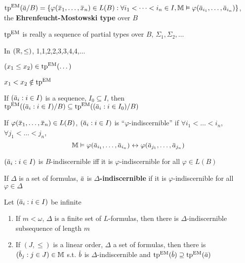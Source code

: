 \documentclass[11pt]{article}
\begin{document}
\begin{definition}[]
\(\tp^{\EM}(\bara/B)=\{\varphi(\barx_1,\dots,\barx_n)\in L(B):\forall i_1<\dots<i_n\in I, \M\vDash\varphi(\bara_{i_1},\dots,\bara_{i_n})\}\),
the \textbf{Ehrenfeucht-Mostowski type} over \(B\)
\end{definition}

\begin{remark}
\(\operatorname{tp}^{\operatorname{EM}}\) is really a sequence of partial types over \(B\), \(\Sigma_1,\Sigma_2,\dots\)
\end{remark}

\begin{examplle}[]
In \((\mathbb{R},\le)\), 1,1,2,2,3,3,4,4,\(\dots\)

\((x_1\le x_2)\in\operatorname{tp}^{\operatorname{EM}}(\dots)\)

\(x_1<x_2\notin\operatorname{tp}^{\operatorname{EM}}\)
\end{examplle}

\begin{remark}
If \((\bara_i:i\in I)\) is a sequence, \(I_0\subseteq I\),
then \(\tp^{\EM}((\bara_i:i\in I)/B)\subseteq\tp^{\EM}((\bara_i:i\in I_0)/B)\)
\end{remark}

\begin{definition}[]
If \(\varphi(\barx_1,\dots,\barx_n)\in L(B)\), \((\bara_i:i\in I)\) is ``\(\varphi\)-indiscernible''
if \(\forall i_1<\dots<i_n\), \(\forall j_1<\dots<j_n\),
\begin{equation*}
\M\vDash\varphi(\bara_{i_1},\dots,\bara_{i_n})\leftrightarrow\varphi(\bara_{j_1},\dots,\bara_{j_n})
\end{equation*}
\end{definition}

\begin{remark}
\((\bara_i:i\in I)\) is \(B\)-indiscernible iff it is \(\varphi\)-indiscernible for all \(\varphi\in L(B)\)
\end{remark}

\begin{definition}[]
If \(\Delta\) is a set of formulas, \(\bara\) is \textbf{\(\Delta\)-indiscernible} if it is \(\varphi\)-indiscernible for
all \(\varphi\in\Delta\)
\end{definition}

\begin{lemma}[]
\label{24-9}
Let \((\bara_i:i\in I)\) be infinite
\begin{enumerate}
\item If \(m<\omega\), \(\Delta\) is a finite set of \(L\)-formulas, then there is \(\Delta\)-indiscernible subsequence of
length \(m\)
\item If \((J,\le)\) is a linear order, \(\Delta\) a set of formulas, then there is \((\barb_j:j\in J)\in\M\)
s.t. \(\barb\) is \(\Delta\)-indiscernible and \(\tp^{\EM}(\barb)\supseteq\tp^{\EM}(\bara)\)
\end{enumerate}
\end{lemma}
\end{document}
